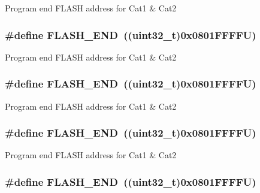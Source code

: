 Program end F\-L\-A\-S\-H address for Cat1 \& Cat2 \hypertarget{group___peripheral__memory__map_ga8be554f354e5aa65370f6db63d4f3ee4}{
\subsubsection[{F\-L\-A\-S\-H\-\_\-\-E\-N\-D}]{\setlength{\rightskip}{0pt plus 5cm}\#define F\-L\-A\-S\-H\-\_\-\-E\-N\-D~((uint32\-\_\-t)0x0801\-F\-F\-F\-F\-U)}}\label{group___peripheral__memory__map_ga8be554f354e5aa65370f6db63d4f3ee4}
Program end F\-L\-A\-S\-H address for Cat1 \& Cat2 \hypertarget{group___peripheral__memory__map_ga8be554f354e5aa65370f6db63d4f3ee4}{
\subsubsection[{F\-L\-A\-S\-H\-\_\-\-E\-N\-D}]{\setlength{\rightskip}{0pt plus 5cm}\#define F\-L\-A\-S\-H\-\_\-\-E\-N\-D~((uint32\-\_\-t)0x0801\-F\-F\-F\-F\-U)}}\label{group___peripheral__memory__map_ga8be554f354e5aa65370f6db63d4f3ee4}
Program end F\-L\-A\-S\-H address for Cat1 \& Cat2 \hypertarget{group___peripheral__memory__map_ga8be554f354e5aa65370f6db63d4f3ee4}{
\subsubsection[{F\-L\-A\-S\-H\-\_\-\-E\-N\-D}]{\setlength{\rightskip}{0pt plus 5cm}\#define F\-L\-A\-S\-H\-\_\-\-E\-N\-D~((uint32\-\_\-t)0x0801\-F\-F\-F\-F\-U)}}\label{group___peripheral__memory__map_ga8be554f354e5aa65370f6db63d4f3ee4}
Program end F\-L\-A\-S\-H address for Cat1 \& Cat2 \hypertarget{group___peripheral__memory__map_ga8be554f354e5aa65370f6db63d4f3ee4}{
\subsubsection[{F\-L\-A\-S\-H\-\_\-\-E\-N\-D}]{\setlength{\rightskip}{0pt plus 5cm}\#define F\-L\-A\-S\-H\-\_\-\-E\-N\-D~((uint32\-\_\-t)0x0801\-F\-F\-F\-F\-U)}}\label{group___peripheral__memory__map_ga8be554f354e5aa65370f6db63d4f3ee4}
